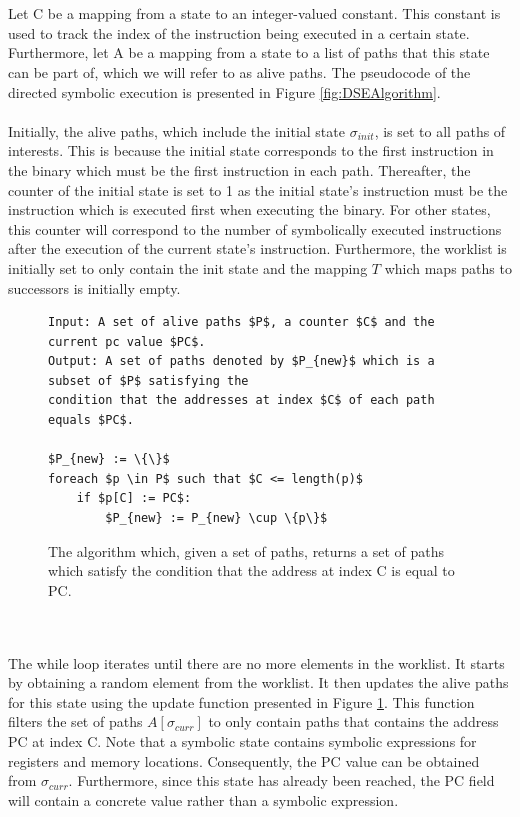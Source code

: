 \documentclass{kththesis}
\begin{document}
\\ \\
Let C be a mapping from a state to an integer-valued constant. This constant is used to track the index of the instruction being executed in a certain state. Furthermore, let A be a mapping from a state to a list of paths that this state can be part of, which we will refer to as alive paths. The pseudocode of the directed symbolic execution is presented in Figure \ref{fig:DSEAlgorithm}.
\\ \\
Initially, the alive paths, which include the initial state $\sigma_{init}$, is set to all paths of interests. This is because the initial state corresponds to the first instruction in the binary which must be the first instruction in each path. Thereafter, the counter of the initial state is set to 1 as the initial state's instruction must be the instruction which is executed first when executing the binary. For other states, this counter will correspond to the number of symbolically executed instructions after the execution of the current state's instruction. Furthermore, the worklist is initially set to only contain the init state and the mapping $T$ which maps paths to successors is initially empty.
\begin{figure}[!htbp]
    \centering
\begin{algorithmFrame}
\begin{lstlisting}[style=algorithm]
Input: A set of alive paths $P$, a counter $C$ and the current pc value $PC$. 
Output: A set of paths denoted by $P_{new}$ which is a subset of $P$ satisfying the
condition that the addresses at index $C$ of each path equals $PC$.

$P_{new} := \{\}$
foreach $p \in P$ such that $C <= length(p)$
    if $p[C] := PC$:
        $P_{new} := P_{new} \cup \{p\}$
\end{lstlisting}
\end{algorithmFrame}
\caption[The algorithm which, given a set of paths, returns a set of paths which satisfy the condition that the address at index C is equal to PC.]{The algorithm which, given a set of paths, returns a set of paths which satisfy the condition that the address at index C is equal to PC.}
    \label{fig:DSEupdate}
\end{figure}
\\ \\
The while loop iterates until there are no more elements in the worklist. It starts by obtaining a random element from the worklist. It then updates the alive paths for this state using the update function presented in Figure \ref{fig:DSEupdate}. This function filters the set of paths $A[\sigma_{curr}]$ to only contain paths that contains the address PC at index C. Note that a symbolic state contains symbolic expressions for registers and memory locations. Consequently, the PC value can be obtained from $\sigma_{curr}$. Furthermore, since this state has already been reached, the PC field will contain a concrete value rather than a symbolic expression.
\end{document}
